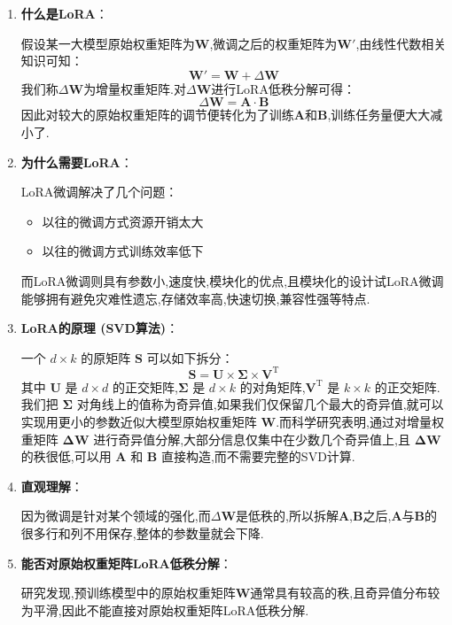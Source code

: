\documentclass[12pt]{ctexart}
\begin{document}
\begin{enumerate}

    \item \textbf{什么是LoRA}：

          假设某一大模型原始权重矩阵为\(\boldsymbol{W}\),微调之后的权重矩阵为\(\boldsymbol{W}'\),由线性代数相关知识可知：
          \[
              \boldsymbol{W}' = \boldsymbol{W} + \Delta\boldsymbol{W}
          \]
          我们称\(\Delta\boldsymbol{W}\)为增量权重矩阵.对\(\Delta\boldsymbol{W}\)进行LoRA低秩分解可得：
          \[
              \Delta\boldsymbol{W} = \boldsymbol{A}\cdot\boldsymbol{B}
          \]
          因此对较大的原始权重矩阵的调节便转化为了训练\(\boldsymbol{A}\)和\(\boldsymbol{B}\),训练任务量便大大减小了.

    \item \textbf{为什么需要LoRA}：

          LoRA微调解决了几个问题：

          \begin{itemize}

              \item 以往的微调方式资源开销太大

              \item 以往的微调方式训练效率低下

          \end{itemize}

          而LoRA微调则具有参数小,速度快,模块化的优点,且模块化的设计试LoRA微调能够拥有避免灾难性遗忘,存储效率高,快速切换,兼容性强等特点.

    \item \textbf{LoRA的原理 (SVD算法)}：

          一个 \(d \times k\) 的原矩阵 \(\boldsymbol{S}\) 可以如下拆分：
          \[
              \boldsymbol{S} = \boldsymbol{U} \times \boldsymbol{\Sigma} \times \boldsymbol{V}^\mathrm{T}
          \]
          其中 \(\boldsymbol{U}\) 是 \(d \times d\) 的正交矩阵,\(\boldsymbol{\Sigma}\) 是 \(d \times k\) 的对角矩阵,\(\boldsymbol{V}^\mathrm{T}\) 是 \(k \times k\) 的正交矩阵.我们把 \(\boldsymbol{\Sigma}\) 对角线上的值称为奇异值,如果我们仅保留几个最大的奇异值,就可以实现用更小的参数近似大模型原始权重矩阵 \(\boldsymbol{W}\).而科学研究表明,通过对增量权重矩阵 \(\boldsymbol{\Delta W}\) 进行奇异值分解,大部分信息仅集中在少数几个奇异值上,且 \(\boldsymbol{\Delta W}\) 的秩很低,可以用 \(\boldsymbol{A}\) 和 \(\boldsymbol{B}\) 直接构造,而不需要完整的SVD计算.

    \item \textbf{直观理解}：

          因为微调是针对某个领域的强化,而\(\Delta\boldsymbol{W}\)是低秩的,所以拆解\(\boldsymbol{A}\),\(\boldsymbol{B}\)之后,\(\boldsymbol{A}\)与\(\boldsymbol{B}\)的很多行和列不用保存,整体的参数量就会下降.


    \item \textbf{能否对原始权重矩阵LoRA低秩分解}：

          研究发现,预训练模型中的原始权重矩阵\(\boldsymbol{W}\)通常具有较高的秩,且奇异值分布较为平滑,因此不能直接对原始权重矩阵LoRA低秩分解.

\end{enumerate}
\end{document}
